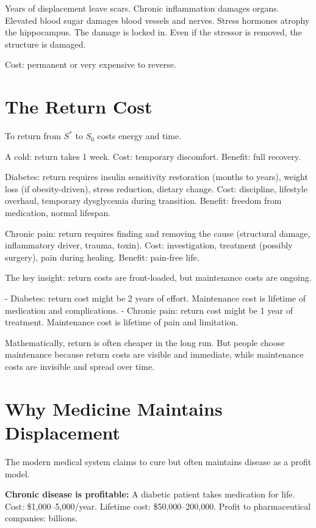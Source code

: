 \documentclass[12pt]{article}
\begin{document}
Years of displacement leave scars. Chronic inflammation damages organs. Elevated blood sugar damages blood vessels and nerves. Stress hormones atrophy the hippocampus. The damage is locked in. Even if the stressor is removed, the structure is damaged.

Cost: permanent or very expensive to reverse.

\section{The Return Cost}

To return from $S^*$ to $S_0$ costs energy and time.

A cold: return takes 1 week. Cost: temporary discomfort. Benefit: full recovery.

Diabetes: return requires insulin sensitivity restoration (months to years), weight loss (if obesity-driven), stress reduction, dietary change. Cost: discipline, lifestyle overhaul, temporary dysglycemia during transition. Benefit: freedom from medication, normal lifespan.

Chronic pain: return requires finding and removing the cause (structural damage, inflammatory driver, trauma, toxin). Cost: investigation, treatment (possibly surgery), pain during healing. Benefit: pain-free life.

The key insight: return costs are front-loaded, but maintenance costs are ongoing. 

- Diabetes: return cost might be 2 years of effort. Maintenance cost is lifetime of medication and complications.
- Chronic pain: return cost might be 1 year of treatment. Maintenance cost is lifetime of pain and limitation.

Mathematically, return is often cheaper in the long run. But people choose maintenance because return costs are visible and immediate, while maintenance costs are invisible and spread over time.

\section{Why Medicine Maintains Displacement}

The modern medical system claims to cure but often maintains disease as a profit model.

\textbf{Chronic disease is profitable:} A diabetic patient takes medication for life. Cost: \$1,000–5,000/year. Lifetime cost: \$50,000–200,000. Profit to pharmaceutical companies: billions.
\end{document}
